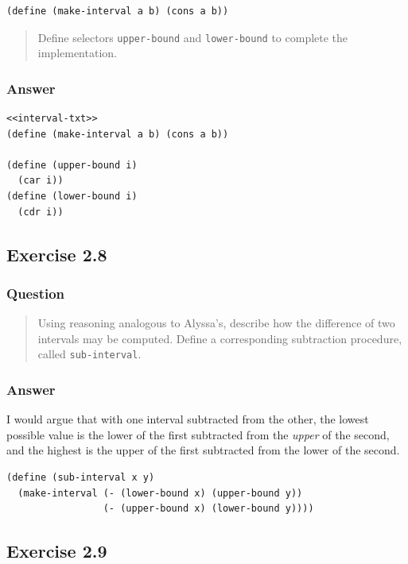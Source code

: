 \documentclass[final,fleqn,titlepage]{article}
\begin{document}
\begin{verbatim}
(define (make-interval a b) (cons a b))
\end{verbatim}

\begin{quote}
Define selectors \texttt{upper-bound} and \texttt{lower-bound} to complete the
implementation.
\end{quote}

\subsubsection{Answer}
\label{sec:org657051c}
\begin{verbatim}
<<interval-txt>>
(define (make-interval a b) (cons a b))

(define (upper-bound i)
  (car i))
(define (lower-bound i)
  (cdr i))
\end{verbatim}

\subsection{Exercise 2.8}
\label{sec:org50a7289}
\subsubsection{Question}
\label{sec:orgae42da4}
\begin{quote}
Using reasoning analogous to Alyssa's, describe how the difference of two
intervals may be computed. Define a corresponding subtraction procedure, called
\texttt{sub-interval}.
\end{quote}
\subsubsection{Answer}
\label{sec:org70a2aa3}
I would argue that with one interval subtracted from the other, the lowest
possible value is the lower of the first subtracted from the \emph{upper} of the
second, and the highest is the upper of the first subtracted from the lower of
the second.
\begin{verbatim}
(define (sub-interval x y)
  (make-interval (- (lower-bound x) (upper-bound y))
                 (- (upper-bound x) (lower-bound y))))
\end{verbatim}
\subsection{Exercise 2.9}
\label{sec:orgc441b1a}
\end{document}
